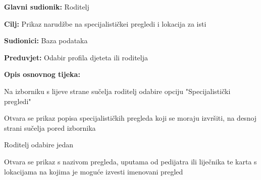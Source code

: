 					\noindent {}
					\begin{packed_item}
						
						\item \textbf{Glavni sudionik: }Roditelj
						\item  \textbf{Cilj:} Prikaz narudžbe na specijalističkei pregledi i lokacija za isti
						\item  \textbf{Sudionici:} Baza podataka
						\item  \textbf{Preduvjet:} Odabir profila djeteta ili roditelja
						\item  \textbf{Opis osnovnog tijeka:}
						
						\item[] \begin{packed_enum}
							
							\item Na izborniku s lijeve strane sučelja roditelj odabire opciju "Specijalistički pregledi"
							\item Otvara se prikaz popisa specijalističkih pregleda koji se moraju izvršiti, na desnoj strani sučelja pored izbornika
							\item Roditelj odabire jedan
							\item Otvara se prikaz s nazivom pregleda, uputama od pedijatra ili liječnika te karta s lokacijama na kojima je moguće izvesti imenovani pregled 
						\end{packed_enum}

					\end{packed_item}
					
